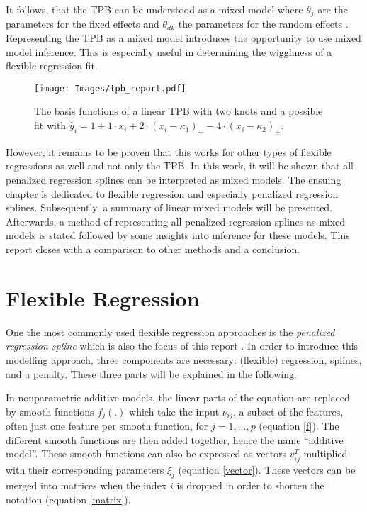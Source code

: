\documentclass[12pt]{article}
\begin{document}
It follows, that the TPB can be understood as a mixed model where $\theta_j$ are the parameters for the fixed effects and $\theta_{dk}$ the parameters for the random effects \cite{ruppert2003semiparametric}. Representing the TPB as a mixed model introduces the opportunity to use mixed model inference. This is especially useful in determining the wiggliness of a flexible regression fit.

\begin{figure}
\begin{center}
\texttt{[image: Images/tpb\_report.pdf]}
\end{center}
\vspace{-2em}
\caption[caption]{The basis functions of a linear TPB with two knots and a possible fit with $\hat{y}_i = 1 + 1 \cdot x_i +  2 \cdot(x_i-\kappa_1)_+ - 4\cdot (x_i-\kappa_2)_+.$}\label{tpb}
\end{figure}

However, it remains to be proven that this works for other types of flexible regressions as well and not only the TPB. 
In this work, it will be shown that all penalized regression splines can be interpreted as mixed models. The ensuing chapter is dedicated to flexible regression and especially penalized regression splines. Subsequently, a summary of linear mixed models will be presented. Afterwards, a method of representing all penalized regression splines as mixed models is stated followed by some insights into inference for these models. This report closes with a comparison to other methods and a conclusion.


\section{Flexible Regression}

One the most commonly used flexible regression approaches is the \textit{penalized regression spline} which is also the focus of this report \cite{fahrmeir2013regression, ruppert2003semiparametric, wood2017generalized}. In order to introduce this modelling approach, three components are necessary: (flexible) regression, splines, and a penalty. These three parts will be explained in the following.

In nonparametric additive models, the linear parts of the equation are replaced by smooth functions $f_j(.)$ which take the input $\nu_{ij}$, a subset of the features, often just one feature per smooth function, for $j = 1,...,p$ (equation \ref{f}). 
The different smooth functions are then added together, hence the name ``additive model''.
These smooth functions can also be expressed as vectors $v^T_{ij}$  multiplied with their corresponding parameters $\xi_j$ (equation \ref{vector}). These vectors can be merged into matrices when the index $i$ is dropped in order to shorten the notation (equation \ref{matrix}).
\end{document}
